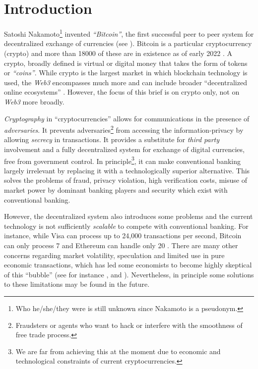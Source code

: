 \documentclass[12pt]{article}
\newcommand{\1}{\mathbbm 1}
\begin{document}
		
		\section{Introduction}
		
		
		
			Satoshi Nakamoto\footnote{Who he/she/they were is still unknown since Nakamoto is a pseudonym.} invented \textit{``Bitcoin''}, the first successful peer to peer system for decentralized exchange of currencies (see \cite{nakamoto2008bitcoin}). Bitcoin is a particular cryptocurrency (crypto) and more than 18000 of these are in existence as of early 2022 \cite{hayesinvestopedia2022}. A crypto, broadly defined is virtual or digital money that takes the form of tokens or \textit{``coins''}. While crypto is the largest market in which blockchain technology is used, the \textit{Web3} encompasses much more and can include broader ``decentralized online ecosystems'' \cite{korpal2022decentralization}. However, the focus of this brief is on crypto only, not on \textit{Web3} more broadly.
			
			
			\textit{Cryptography} in ``cryptocurrencies'' allows for communications in the presence of \textit{adversaries}. It prevents adversaries\footnote{Fraudsters or agents who want to hack or interfere with the smoothness of free trade process.} from accessing the information-privacy by allowing \textit{secrecy} in transactions. It provides a substitute for \textit{third party} involvement and a fully decentralized system for exchange of digital currencies, free from government control. In principle\footnote{We are far from achieving this at the moment due to economic and technological constraints of current cryptocurrencies.}, it can make conventional banking largely irrelevant by replacing it with a technologically superior alternative. This solves the problems of fraud, privacy violation, high verification costs, misuse of market power by dominant banking players and security which exist with conventional banking.
			
			
			However, the decentralized system also introduces some problems and the current technology is not sufficiently \textit{scalable} to compete with conventional banking. For instance, while Visa can process up to 24,000 transactions per second, Bitcoin can only process 7 and Ethereum can handle only 20 \cite{crypto}. There are many other concerns regarding market volatility, speculation and limited use in pure economic transactions, which has led some economists to become highly skeptical of this ``bubble'' (see for instance \cite{krugman2018transaction}, \cite{roubini2018blockchain} and \cite{cochrane2017bitcoin}). Nevertheless, in principle some solutions to these limitations may be found in the future.
			
\end{document}
